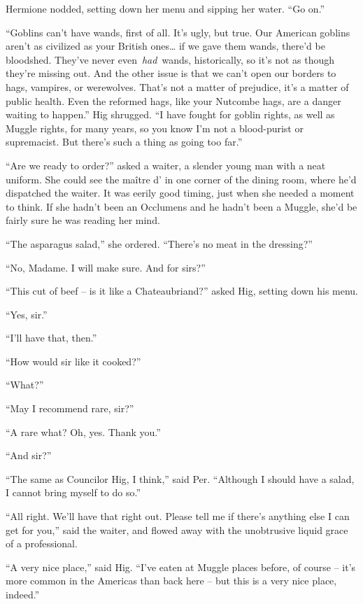 Hermione nodded, setting down her menu and sipping her water. ``Go on.''

``Goblins can't have wands, first of all. It's ugly, but true. Our
American goblins aren't as civilized as your British ones\ldots{} if we
gave them wands, there'd be bloodshed. They've never
even~\emph{had}~wands, historically, so it's not as though they're
missing out. And the other issue is that we can't open our borders to
hags, vampires, or werewolves. That's not a matter of prejudice, it's a
matter of public health. Even the reformed hags, like your Nutcombe
hags, are a danger waiting to happen.'' Hig shrugged. ``I have fought
for goblin rights, as well as Muggle rights, for many years, so you know
I'm not a blood-purist or supremacist. But there's such a thing as going
too far.''

``Are we ready to order?'' asked a waiter, a slender young man with a
neat uniform. She could see the maître d' in one corner of the dining
room, where he'd dispatched the waiter. It was eerily good timing, just
when she needed a moment to think. If she hadn't been an Occlumens and
he hadn't been a Muggle, she'd be fairly sure he was reading her mind.

``The asparagus salad,'' she ordered. ``There's no meat in the
dressing?''

``No, Madame. I will make sure. And for sirs?''

``This cut of beef -- is it like a Chateaubriand?'' asked Hig, setting
down his menu.

``Yes, sir.''

``I'll have that, then.''

``How would sir like it cooked?''

``What?''

``May I recommend rare, sir?''

``A rare what? Oh, yes. Thank you.''

``And sir?''

``The same as Councilor Hig, I think,'' said Per. ``Although I should
have a salad, I cannot bring myself to do so.''

``All right. We'll have that right out. Please tell me if there's
anything else I can get for you,'' said the waiter, and flowed away with
the unobtrusive liquid grace of a professional.

``A very nice place,'' said Hig. ``I've eaten at Muggle places before,
of course -- it's more common in the Americas than back here -- but this
is a very nice place, indeed.''

